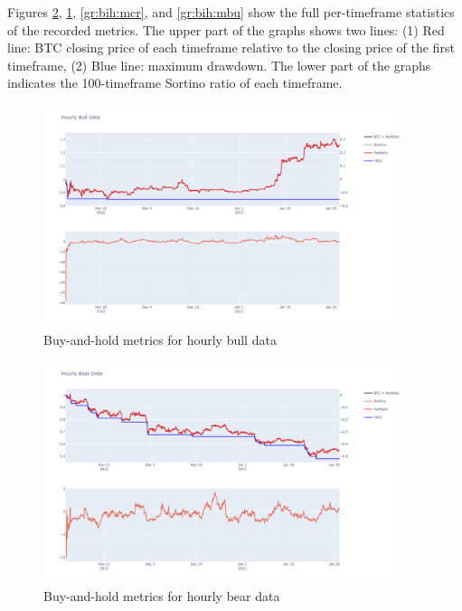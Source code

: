 Figures \ref{gr:bih:HBr}, \ref{gr:bih:hbu}, \ref{gr:bih:mcr}, and \ref{gr:bih:mbu} show the full per-timeframe statistics of the recorded metrics. The upper part of the graphs shows two lines: (1) Red line: BTC closing price of each timeframe relative to the closing price of the first timeframe, (2) Blue line: maximum drawdown. The lower part of the graphs indicates the 100-timeframe Sortino ratio of each timeframe.

\begin{figure}[H]
    \centering
    \includegraphics[width=0.94\textwidth]{graphics/results/01_hourly_bull.png}
    \caption{Buy-and-hold metrics for hourly bull data}
    \label{gr:bih:hbu}
\end{figure}

\begin{figure}[H]
    \centering
    \includegraphics[width=0.94\textwidth]{graphics/results/01_hourly_bear.png}
    \caption{Buy-and-hold metrics for hourly bear data}
    \label{gr:bih:HBr}
\end{figure}

